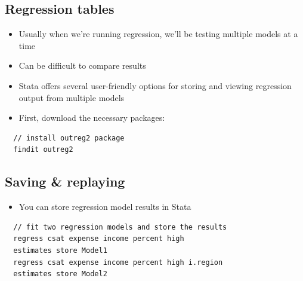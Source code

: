 \documentclass[]{book}
\providecommand{\tightlist}{%
  \setlength{\itemsep}{0pt}\setlength{\parskip}{0pt}}
\begin{document}
\hypertarget{regression-tables}{%
\subsection{Regression tables}\label{regression-tables}}

\begin{itemize}
\tightlist
\item
  Usually when we're running regression, we'll be testing multiple models at a time
\item
  Can be difficult to compare results
\item
  Stata offers several user-friendly options for storing and viewing regression output from multiple models
\item
  First, download the necessary packages:
\end{itemize}

\begin{verbatim}
  // install outreg2 package
  findit outreg2
\end{verbatim}

\hypertarget{saving-replaying}{%
\subsection{Saving \& replaying}\label{saving-replaying}}

\begin{itemize}
\tightlist
\item
  You can store regression model results in Stata
\end{itemize}

\begin{verbatim}
  // fit two regression models and store the results
  regress csat expense income percent high
  estimates store Model1
  regress csat expense income percent high i.region
  estimates store Model2
\end{verbatim}
\end{document}
